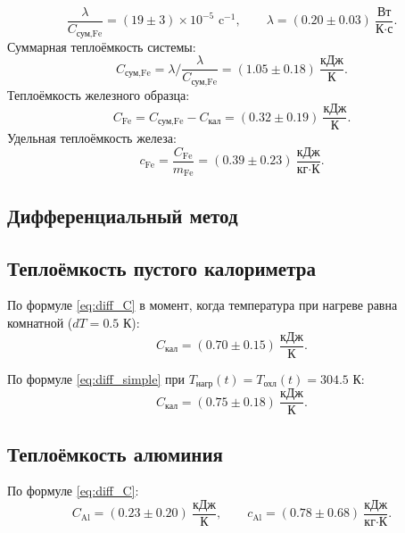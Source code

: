 \documentclass[a4paper,12pt]{article}
\begin{document}
\begin{equation}
    \frac{\lambda}{C_{\text{сум,Fe}}} = (19 \pm 3) \times 10^{-5} \text{ c}^{-1}, \qquad
    \lambda = (0.20 \pm 0.03) \ \frac{\text{Вт}}{\text{К} \cdot \text{с}}.
\end{equation}
Суммарная теплоёмкость системы:
\begin{equation}
    C_{\text{сум,Fe}} = \lambda \Big/ \frac{\lambda}{C_{\text{сум,Fe}}} = (1.05 \pm 0.18) \ \frac{\text{кДж}}{\text{К}}.
\end{equation}
Теплоёмкость железного образца:
\begin{equation}
    C_{\text{Fe}} = C_{\text{сум,Fe}} - C_{\text{кал}} = (0.32 \pm 0.19) \ \frac{\text{кДж}}{\text{К}}.
\end{equation}
Удельная теплоёмкость железа:
\begin{equation}
    c_{\text{Fe}} = \frac{C_{\text{Fe}}}{m_{\text{Fe}}} = (0.39 \pm 0.23) \ \frac{\text{кДж}}{\text{кг} \cdot \text{К}}.
\end{equation}

\subsection*{Дифференциальный метод}
\subsection{Теплоёмкость пустого калориметра}
По формуле \eqref{eq:diff_C} в момент, когда температура при нагреве равна комнатной ($dT = 0.5$ К):
\begin{equation}
    C_{\text{кал}} = (0.70 \pm 0.15) \ \frac{\text{кДж}}{\text{К}}.
\end{equation}

По формуле \eqref{eq:diff_simple} при $T_{\text{нагр}}(t) = T_{\text{охл}}(t) = 304.5$ К:
\begin{equation}
    C_{\text{кал}} = (0.75 \pm 0.18) \ \frac{\text{кДж}}{\text{К}}.
\end{equation}

\subsection{Теплоёмкость алюминия}

По формуле \eqref{eq:diff_C}:
\begin{equation}
    C_{\text{Al}} = (0.23 \pm 0.20) \ \frac{\text{кДж}}{\text{К}}, \qquad
    c_{\text{Al}} = (0.78 \pm 0.68) \ \frac{\text{кДж}}{\text{кг} \cdot \text{К}}.
\end{equation}
\end{document}
